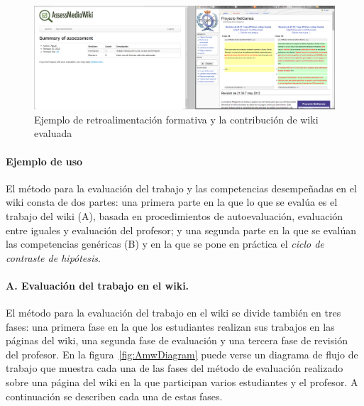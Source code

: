 \begin{figure}
  \begin{center}
    \includegraphics[scale=0.19]{AmwFormative.png}
  \end{center}
  \caption{Ejemplo de retroalimentación formativa y la contribución de wiki evaluada}
  \label{fig:AmwFormative}
\end{figure}

			\paragraph{Ejemplo de uso}

			El método para la evaluación del trabajo y las competencias desempeñadas en el wiki consta de dos partes: una primera parte en la que lo que se evalúa es el trabajo del wiki (A), basada en procedimientos de autoevaluación, evaluación entre iguales y evaluación del profesor; y una segunda parte en la que se evalúan las competencias genéricas (B) y en la que se pone en práctica el \emph{ciclo de contraste de hipótesis}.

			\paragraph*{A. Evaluación del trabajo en el wiki.}

			El método para la evaluación del trabajo en el wiki se divide también en tres fases: una primera fase en la que los estudiantes realizan sus trabajos en las páginas del wiki, una segunda fase de evaluación y una tercera fase de revisión del profesor. En la figura~\ref{fig:AmwDiagram} puede verse un diagrama de flujo de trabajo que muestra cada una de las fases del método de evaluación realizado sobre una página del wiki en la que participan varios estudiantes y el profesor. A continuación se describen cada una de estas fases.

